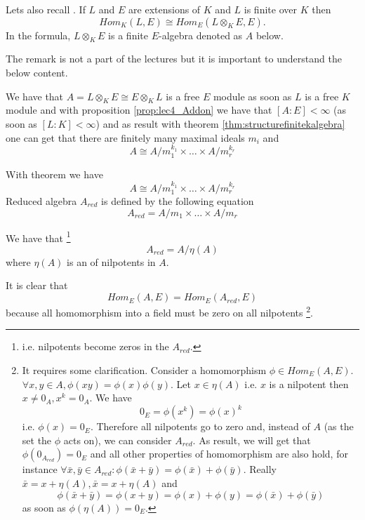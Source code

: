 Lets also recall . If $L$ and $E$ are
extensions of $K$ and $L$ is finite over $K$ then
\[
Hom_K\left(L, E\right) \cong
Hom_E\left(
L \otimes_K E, E
\right).
\]
In the formula, $L \otimes_K E$ is a finite $E$-algebra denoted as $A$
below.
\begin{remark}
  The remark is not a part of the lectures but it is important to
  understand the below content.

  We have that $A = L \otimes_K E \cong E \otimes_K L$ is a free $E$
  module as soon as $L$ is a free $K$ module and with proposition
  \ref{prop:lec4_Addon} we have that $\left[A : E\right] < \infty$
  (as soon as $\left[L : K\right] < \infty$)
  and
  as result with theorem \ref{thm:structurefinitekalgebra} one can get
  that there are finitely many maximal ideals $m_i$ and
  \[
  A \cong A/m_1^{k_1} \times \dots \times A/m_r^{k_r}
  \]
  \label{rem:lec5_own1}
\end{remark}

\begin{definition}
  With  theorem we have
  \[
  A \cong A/m_1^{k_1} \times \dots \times A/m_r^{k_r}
  \]
  Reduced algebra $A_{red}$ is defined by the following equation
  \[
  A_{red} = A/m_1 \times \dots \times A/m_r
  \]
  \label{def:reducedalgebra}
\end{definition}

We have that
\footnote{
  i.e. nilpotents become zeros in the $A_{red}$.
}
\[
A_{red} = A /\eta\left(A\right)
\]
where $\eta\left(A\right)$ is an  of
nilpotents in $A$.

It is clear that
\[
Hom_E\left(A, E\right) =
Hom_E\left(A_{red}, E\right)
\]
because all homomorphism into a field must be zero on all nilpotents
\footnote{
  It requires some clarification. Consider a homomorphism
  $\phi \in Hom_E\left(A, E\right)$. $\forall x,y \in A, \phi(xy) =
  \phi(x)\phi(y)$. Let $x \in \eta\left(A\right)$ i.e. $x$ is a
  nilpotent then $x \ne 0_A, x^k = 0_A$. We have
  \[
  0_E = \phi(x^k) = \phi(x)^k
  \]
  i.e. $\phi(x) =  0_E$. Therefore all nilpotents go to zero and,
  instead of $A$ (as the set the $\phi$ acts on), we can consider
  $A_{red}$. As result, we will get that $\phi(0_{A_{red}}) = 0_E$ and all
  other properties of homomorphism are also hold, for instance
  $\forall \bar{x},\bar{y} \in A_{red}: \phi(\bar{x}+\bar{y}) =
  \phi(\bar{x}) + \phi(\bar{y})$. Really
  $\bar{x} = x + \eta(A), \bar{x} = x + \eta(A)$ and
  \[
  \phi(\bar{x}+\bar{y}) =
  \phi(x+y) = \phi(x) + \phi(y) =
  \phi(\bar{x}) + \phi(\bar{y})
  \]
  as soon as $\phi(\eta(A)) = 0_E$.
}. 

